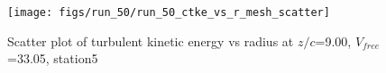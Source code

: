 \begin{figure}[H]
\centering
\texttt{[image: figs/run\_50/run\_50\_ctke\_vs\_r\_mesh\_scatter]}
\caption{Scatter plot of turbulent kinetic energy vs radius at $z/c$=9.00, $V_{free}$=33.05, station5}
\label{fig:run_50_ctke_vs_r_mesh_scatter}
\end{figure}


